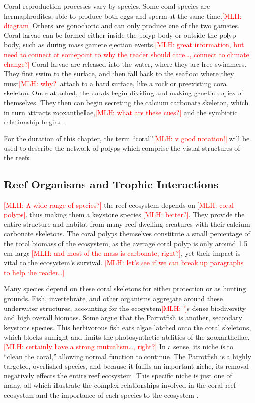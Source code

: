 \documentclass{book}\usepackage{knitr}
\newcommand{\red}[1]{\textcolor{red}{[MLH: #1]}}
\begin{document}
\begin{knitrout}
\begin{kframe}
{Coral reproduction processes vary by species. Some coral species are hermaphrodites, able to produce both eggs and sperm at the same time.\red{diagram} Others are gonochoric and can only produce one of the two gametes. Coral larvae can be formed either inside the polyp body or outside the polyp body, such as during mass gamete ejection events.\red{great information, but need to connect at somepoint to why the reader should care\ldots, connect to climate change?} Coral larvae are released into the water, where they are free swimmers. They first swim to the surface, and then fall back to the seafloor where they must\red{why?}  attach to a hard surface, like a rock or preexisting coral skeleton. Once attached, the corals begin dividing and making genetic copies of themselves. They then can begin secreting the calcium carbonate skeleton, which in turn attracts zooxanthellae,\red{what are these cues?} and the symbiotic relationship begins \citep{coralreefalliance_2021}.

For the duration of this chapter, the term ``coral''\red{v good notation!} will be used to describe the network of polyps which comprise the visual structures of the reefs. 

\subsection{Reef Organisms and Trophic Interactions}

\red{A wide range of species?} the reef ecosystem depends on \red{coral polyps}, thus making them a keystone species \red{better?}. They provide the entire structure and habitat from many reef-dwelling creatures with their calcium carbonate skeletons. The coral polyps themselves constitute a small percentage of the total biomass of the ecosystem, as the average coral polyp is only around 1.5 cm large \red{and most of the mass is carbonate, right?}, yet their impact is vital to the ecosystem's survival. \red{let's see if we can break up paragraphs to help the reader\ldots} 

Many species depend on these coral skeletons for either protection or as hunting grounds. Fish, invertebrate, and other organisms aggregate around these underwater structures, accounting for the ecosystem\red{’}s dense biodiversity and high overall biomass. Some argue that the Parrotfish is another, secondary keystone species. This herbivorous fish eats algae latched onto the coral skeletons, which blocks sunlight and limits the photosynthetic abilities of the zooxanthellae.\red{certainly have a strong mutualism\ldots, right?} In a sense, its niche is to ``clean the coral,'' allowing normal function to continue. The Parrotfish is a highly targeted, overfished species, and because it fulfils an important niche, its removal negatively effects the entire reef ecosystem. This specific niche is just one of many, all which illustrate the complex relationships involved in the coral reef ecosystem and the importance of each species to the ecosystem \citep{https://doi.org/10.1890/15-1492.1}. 

}
\end{kframe}
\end{knitrout}
\end{document}
